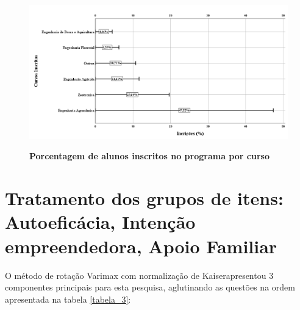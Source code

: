 \begin{figure}[!htb]
\centering
\caption{\textbf{Porcentagem de alunos inscritos no programa por curso}}
\includegraphics[scale=0.4]{Imagens/inscritos.png}
\label{figura_10}
\end{figure}

\newpage


\section{Tratamento dos grupos de itens: Autoeficácia, Intenção empreendedora, Apoio Familiar}


O método de rotação Varimax com normalização de Kaiser\footnotemark[1] apresentou 3 componentes principais para esta pesquisa, aglutinando as questões na ordem apresentada na tabela \ref{tabela_3}:


